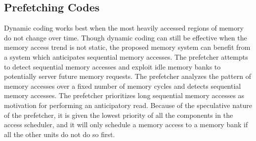 {\color{blue}
\subsection{Prefetching Codes}
\label{sec:prefetching}
Dynamic coding works best when the most heavily accessed regions of memory do not change over time. Though dynamic coding can still be effective when the memory access trend is not static, the proposed memory system can benefit from a system which anticipates sequential memory accesses. 
The prefetcher attempts to detect sequential memory accesses and exploit idle memory banks to potentially server future memory requests. The prefetcher analyzes the pattern of memory accesses over a fixed number of memory cycles and detects sequential memory accesses. The prefetcher prioritizes long sequential memory accesses as motivation for performing an anticipatory read. Because of the speculative nature of the prefetcher, it is given the lowest priority of all the components in the access scheduler, and it will only schedule a memory access to a memory bank if all the other units do not do so first. 
}
